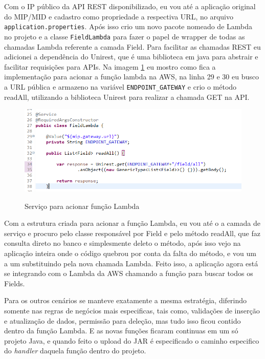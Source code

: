 Com o IP público da API REST disponibilizado, eu vou até a aplicação original do MIP/MID e cadastro como propriedade a respectiva URL, no arquivo \texttt{application.properties}. Após isso crio um novo pacote nomeado de Lambda no projeto e a classe \texttt{FieldLambda} para fazer o papel de wrapper de todas as chamadas Lambda referente a camada Field. Para facilitar as chamadas REST eu adicionei a dependência do Unirest, que é uma biblioteca em java para abstrair e facilitar requisições para APIs. Na imagem \ref{fig:field-lambda-service} eu mostro como fica a implementação para acionar a função lambda na AWS, na linha 29 e 30 eu busco a URL pública e armazeno na variável \texttt{ENDPOINT\_GATEWAY} e crio o método readAll, utilizando a biblioteca Unirest para realizar a chamada GET na API.

\begin{figure}[!htb]
	\centering
	\caption{Serviço para acionar função Lambda}
	\includegraphics[width=1\textwidth,height=0.3\textheight]{./dados/figuras/field-lambda-service}
	\label{fig:field-lambda-service}
\end{figure}

\clearpage
Com a estrutura criada para acionar a função Lambda, eu vou até o a camada de serviço e procuro pelo classe responsável por Field e pelo método readAll, que faz consulta direto no banco e simplesmente deleto o método, após isso vejo na aplicação inteira onde o código quebrou por conta da falta do método, e vou um a um substituindo pela nova chamada Lambda. Feito isso, a aplicação agora está se integrando com o Lambda da AWS chamando a função para buscar todos os Fields.

Para os outros cenários se manteve exatamente a mesma estratégia, diferindo somente nas regras de negócios mais especificas, tais como, validações de inserção e atualização de dados, permissão para deleção, mas tudo isso ficou contido dentro da função Lambda. E as novas funções ficaram continuas em um só projeto Java, e quando feito o upload do JAR é especificado o caminho especifico do \textit{handler} daquela função dentro do projeto.